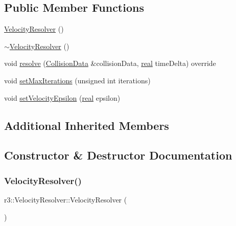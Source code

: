 \subsection*{Public Member Functions}
\begin{DoxyCompactItemize}
\item 
\mbox{\hyperlink{classr3_1_1_velocity_resolver_a827566c5d9dca936b4609dc74c587a6f}{Velocity\+Resolver}} ()
\item 
\mbox{\hyperlink{classr3_1_1_velocity_resolver_a508677a0bf2d5258ffc1550677517074}{$\sim$\+Velocity\+Resolver}} ()
\item 
void \mbox{\hyperlink{classr3_1_1_velocity_resolver_a93e8859d1ab3407b073328a58b7caeef}{resolve}} (\mbox{\hyperlink{classr3_1_1_collision_data}{Collision\+Data}} \&collision\+Data, \mbox{\hyperlink{namespacer3_ab2016b3e3f743fb735afce242f0dc1eb}{real}} time\+Delta) override
\item 
void \mbox{\hyperlink{classr3_1_1_velocity_resolver_af0ec50fd4405261fc97b1985c127d3a6}{set\+Max\+Iterations}} (unsigned int iterations)
\item 
void \mbox{\hyperlink{classr3_1_1_velocity_resolver_a91b4f4f3c064f11983ae9dbe40232c86}{set\+Velocity\+Epsilon}} (\mbox{\hyperlink{namespacer3_ab2016b3e3f743fb735afce242f0dc1eb}{real}} epsilon)
\end{DoxyCompactItemize}
\subsection*{Additional Inherited Members}


\subsection{Constructor \& Destructor Documentation}
\mbox{\label{classr3_1_1_velocity_resolver_a827566c5d9dca936b4609dc74c587a6f}} 
\subsubsection{\texorpdfstring{Velocity\+Resolver()}{VelocityResolver()}}
{\footnotesize\ttfamily r3\+::\+Velocity\+Resolver\+::\+Velocity\+Resolver (\begin{DoxyParamCaption}{ }\end{DoxyParamCaption})\hspace{0.3cm}{\ttfamily [explicit]}}

